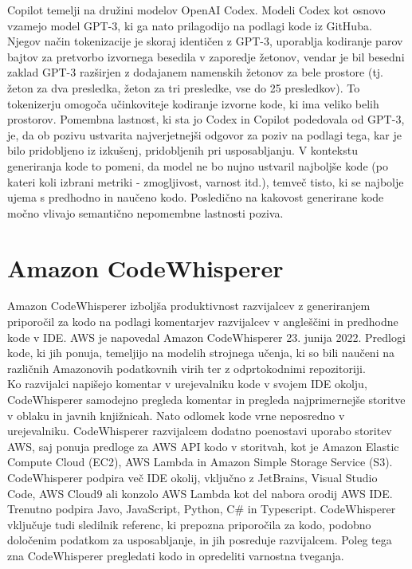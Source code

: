 \documentclass[a4paper,12pt,openright]{book}
\begin{document}
Copilot temelji na družini modelov OpenAI Codex. Modeli Codex kot osnovo vzamejo model GPT-3, ki ga nato prilagodijo na podlagi kode iz GitHuba. Njegov način tokenizacije je skoraj identičen z GPT-3, uporablja kodiranje parov bajtov za pretvorbo izvornega besedila v zaporedje žetonov, vendar je bil besedni zaklad GPT-3 razširjen z dodajanem namenskih žetonov za bele prostore (tj. žeton za dva presledka, žeton za tri presledke, vse do 25 presledkov). To tokenizerju omogoča učinkoviteje kodiranje izvorne kode, ki ima veliko belih prostorov. Pomembna lastnost, ki sta jo Codex in Copilot podedovala od GPT-3, je, da ob pozivu ustvarita najverjetnejši odgovor za poziv na podlagi tega, kar je bilo pridobljeno iz izkušenj, pridobljenih pri usposabljanju. V kontekstu generiranja kode to pomeni, da model ne bo nujno ustvaril najboljše kode (po kateri koli izbrani metriki - zmogljivost, varnost itd.), temveč tisto, ki se najbolje ujema s predhodno in naučeno kodo. Posledično na kakovost generirane kode močno vlivajo semantično nepomembne lastnosti poziva. \cite{9833571, 10.1145/3520312.3534862}



\section{Amazon CodeWhisperer}
Amazon CodeWhisperer izboljša produktivnost razvijalcev z generiranjem priporočil za kodo na podlagi komentarjev razvijalcev v angleščini in predhodne kode v IDE. AWS je napovedal Amazon CodeWhisperer 23. junija 2022.
Predlogi kode, ki jih ponuja, temeljijo na modelih strojnega učenja, ki so bili naučeni na različnih Amazonovih podatkovnih virih ter z odprtokodnimi repozitoriji.\cite{aws_developer} \\
Ko razvijalci napišejo komentar v urejevalniku kode v svojem IDE okolju, CodeWhisperer samodejno pregleda komentar in pregleda najprimernejše storitve v oblaku in javnih knjižnicah. Nato odlomek kode vrne neposredno v urejevalniku. CodeWhisperer razvijalcem dodatno poenostavi uporabo storitev AWS, saj ponuja predloge za AWS API kodo v storitvah, kot je Amazon Elastic Compute Cloud (EC2), AWS Lambda in Amazon Simple Storage Service (S3). CodeWhisperer podpira več IDE okolij, vključno z JetBrains, Visual Studio Code, AWS Cloud9 ali konzolo AWS Lambda kot del nabora orodij AWS IDE. Trenutno podpira Javo, JavaScript, Python, C\# in Typescript. CodeWhisperer vključuje tudi sledilnik referenc, ki prepozna priporočila za kodo, podobno določenim podatkom za usposabljanje, in jih posreduje razvijalcem. Poleg tega zna CodeWhisperer pregledati kodo in opredeliti varnostna tveganja. \cite{saasworthy_codewhisperer}
\pagebreak
\end{document}
